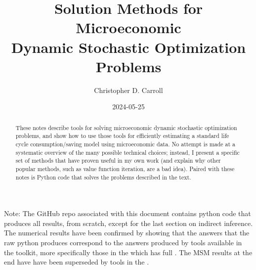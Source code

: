 \documentclass[titlepage, headings=optiontotocandhead]{econtex}
\begin{document}


\title{Solution Methods for Microeconomic \\ Dynamic Stochastic Optimization Problems}

\author{Christopher D. Carroll\authNum}


\date{2024-05-25}
\maketitle
\footnotesize


\noindent  Note: The GitHub repo {\SMDSOPrepo} associated with this document contains python code that produces all results, from scratch, except for the last section on indirect inference.  The numerical results have been confirmed by showing that the answers that the raw python produces correspond to the answers produced by tools available in the {\ARKurl} toolkit, more specifically those in the {\HARKrepo} which has full {\HARKdocs}.  The MSM results at the end have have been superseded by tools in the {\EMDSOPrepo}.

\normalsize

\hypertarget{abstract}{}
\begin{abstract}
  These notes describe tools for solving microeconomic dynamic stochastic optimization problems, and show how to use those tools for efficiently estimating a standard life cycle consumption/saving model using microeconomic data.  No attempt is made at a systematic overview of the many possible technical choices; instead, I present a specific set of methods that have proven useful in my own work (and explain why other popular methods, such as value function iteration, are a bad idea).  Paired with these notes is Python code that solves the problems described in the text.
\end{abstract}
\end{document}
